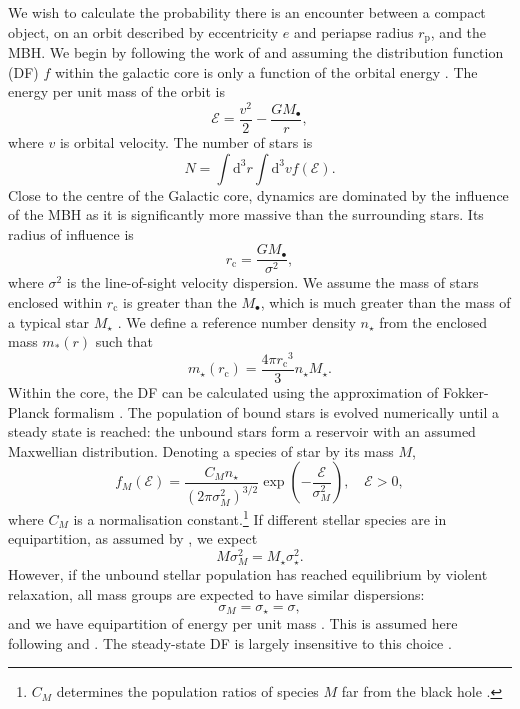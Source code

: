 \documentclass[useAMS,usedcolumn,usegraphicx,usenatbib]{mn2e}
\newcommand{\sub}[1]{\ensuremath{_\mathrm{#1}}}
\newcommand{\dd}{\ensuremath{\mathrm{d}}}
\begin{document}
We wish to calculate the probability there is an encounter between a compact object, on an orbit described by eccentricity $e$ and periapse radius $r\sub{p}$, and the MBH. We begin by following the work of \citet{Bahcall1976, Bahcall1977} and assuming the distribution function (DF) $f$ within the galactic core is only a function of the orbital energy \citep{Shapiro1978}. The energy per unit mass of the orbit is
\begin{equation}
\mathcal{E} = \frac{v^2}{2} - \frac{GM_\bullet}{r},
\end{equation}
where $v$ is orbital velocity. The number of stars is
\begin{equation}
N = \int \dd^3r \int \dd^3v f(\mathcal{E}).
\end{equation}
Close to the centre of the Galactic core, dynamics are dominated by the influence of the MBH as it is significantly more massive than the surrounding stars. Its radius of influence is \citep{Frank1976}
\begin{equation}
r\sub{c} = \frac{GM_\bullet}{\sigma^2},
\label{eq:r_c}
\end{equation}
where $\sigma^2$ is the line-of-sight velocity dispersion. We assume the mass of stars enclosed within $r\sub{c}$ is greater than the $M_\bullet$, which is much greater than the mass of a typical star $M_\star$ \citep{Bahcall1976}. We define a reference number density $n_\star$ from the enclosed mass $m_\ast(r)$ such that
\begin{equation}
m_\star(r\sub{c}) = \frac{4\pi r\sub{c}^3}{3}n_\star M_\star.
\end{equation}
Within the core, the DF can be calculated using the approximation of Fokker-Planck formalism \citep[section 7.4]{Binney2008}. The population of bound stars is evolved numerically until a steady state is reached: the unbound stars form a reservoir with an assumed Maxwellian distribution. Denoting a species of star by its mass $M$,
\begin{equation}
f_M(\mathcal{E}) = \frac{C_M n_\star}{(2\pi\sigma_M^2)^{3/2}} \exp\left(-\frac{\mathcal{E}}{\sigma_M^2}\right),\quad\mathcal{E} > 0,
\label{eq:Unbound_DF}
\end{equation}
where $C_M$ is a normalisation constant.\footnote{$C_M$ determines the population ratios of species $M$ far from the black hole \citep{Alexander2009}.} If different stellar species are in equipartition, as assumed by \citet{Bahcall1976, Bahcall1977}, we expect
\begin{equation}
M \sigma_M^2 = M_\star \sigma_\star^2.
\end{equation}
However, if the unbound stellar population has reached equilibrium by violent relaxation, all mass groups are expected to have similar dispersions:
\begin{equation}
\sigma_M = \sigma_\star = \sigma,
\end{equation}
and we have equipartition of energy per unit mass \citep{Lynden-Bell1967}. This is assumed here following \citet{Alexander2009} and \citet{O'Leary2009}. The steady-state DF is largely insensitive to this choice \citep{Bahcall1977, Alexander2009}.
\end{document}
